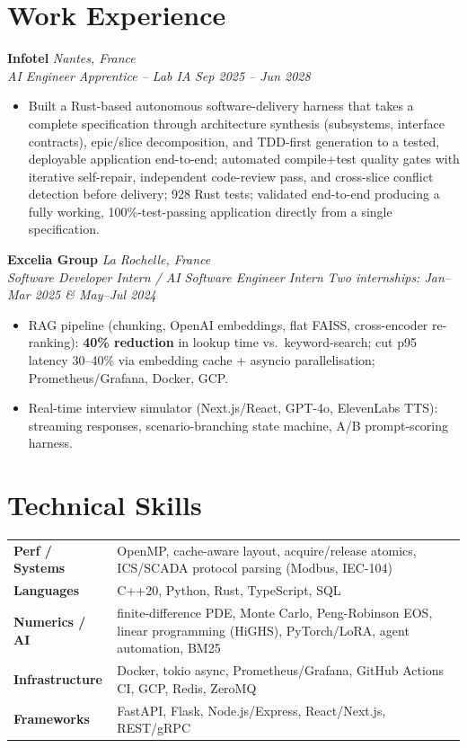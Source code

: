 \documentclass[10pt]{article}
\newcommand{\entry}[4]{%
  \noindent\textbf{#1} \hfill \textit{#2} \\
  \textit{#3} \hfill \textit{#4}\\[-0.22em]
}
\begin{document}
\section*{Work Experience}
\entry{Infotel}{Nantes, France}{AI Engineer Apprentice -- Lab IA}{Sep 2025 -- Jun 2028}
\begin{itemize}
  \item Built a Rust-based autonomous software-delivery harness that takes a complete specification through architecture synthesis (subsystems, interface contracts), epic/slice decomposition, and TDD-first generation to a tested, deployable application end-to-end; automated compile+test quality gates with iterative self-repair, independent code-review pass, and cross-slice conflict detection before delivery; 928 Rust tests; validated end-to-end producing a fully working, 100\%-test-passing application directly from a single specification.
\end{itemize}
\entry{Excelia Group}{La Rochelle, France}{Software Developer Intern / AI Software Engineer Intern}{Two internships: Jan--Mar 2025 \& May--Jul 2024}
\begin{itemize}
  \item RAG pipeline (chunking, OpenAI embeddings, flat FAISS, cross-encoder re-ranking): \textbf{40\% reduction} in lookup time vs.\ keyword-search; cut p95 latency 30--40\% via embedding cache + asyncio parallelisation; Prometheus/Grafana, Docker, GCP.
  \item Real-time interview simulator (Next.js/React, GPT-4o, ElevenLabs TTS): streaming responses, scenario-branching state machine, A/B prompt-scoring harness.
\end{itemize}

\section*{Technical Skills}
\noindent
\begin{tabular}{@{}p{2.7cm}p{15.5cm}@{}}
\textbf{Perf / Systems} & OpenMP, cache-aware layout, acquire/release atomics, ICS/SCADA protocol parsing (Modbus, IEC-104) \\
\textbf{Languages} & C++20, Python, Rust, TypeScript, SQL \\
\textbf{Numerics / AI} & finite-difference PDE, Monte Carlo, Peng-Robinson EOS, linear programming (HiGHS), PyTorch/LoRA, agent automation, BM25 \\
\textbf{Infrastructure} & Docker, tokio async, Prometheus/Grafana, GitHub Actions CI, GCP, Redis, ZeroMQ \\
\textbf{Frameworks} & FastAPI, Flask, Node.js/Express, React/Next.js, REST/gRPC \\
\end{tabular}
\end{document}
